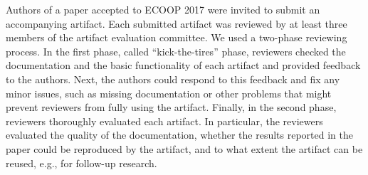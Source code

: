 \documentclass[a4paper,UKenglish]{dartsmaster}
\begin{document}
Authors of a paper accepted to ECOOP 2017 were invited to submit an 
accompanying artifact. Each submitted artifact was reviewed by at least 
three members of the artifact evaluation committee. We used a two-phase 
reviewing process. In the first phase, called ``kick-the-tires'' phase, 
reviewers checked the documentation and the basic functionality of each 
artifact and provided feedback to the authors. Next, the authors could 
respond to this feedback and fix any minor issues, such as missing 
documentation or other problems that might prevent reviewers from fully 
using the artifact. Finally, in the second phase, reviewers thoroughly 
evaluated each artifact. In particular, the reviewers evaluated the quality 
of the documentation, whether the results reported in the paper could be 
reproduced by the artifact, and to what extent the artifact can be reused, 
e.g., for follow-up research.
\end{document}
